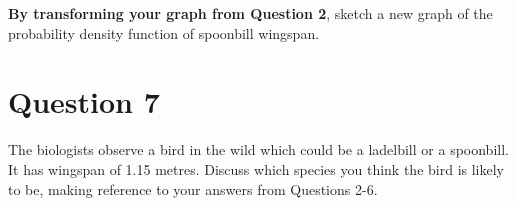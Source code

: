 \documentclass[12pt]{article}
\begin{document}
\textbf{By transforming your graph from Question 2}, sketch a new graph of the probability density function of spoonbill wingspan.

\section*{Question 7}
The biologists observe a bird in the wild which could be a ladelbill or a spoonbill. It has wingspan of 1.15 metres. Discuss which species you think the bird is likely to be, making reference to your answers from Questions 2-6.
\end{document}
